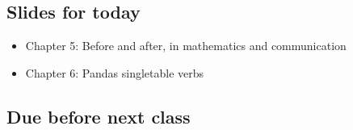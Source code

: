 \documentclass[letterpaper,10pt,english]{sphinxmanual}
\begin{document}
\subsection{Slides for today}
\label{\detokenize{course-schedule:id3}}\begin{itemize}
\item {} 
Chapter 5: Before and after, in mathematics and communication

\item {} 
Chapter 6: Pandas single\sphinxhyphen{}table verbs

\end{itemize}


\subsection{Due before next class}
\end{document}
